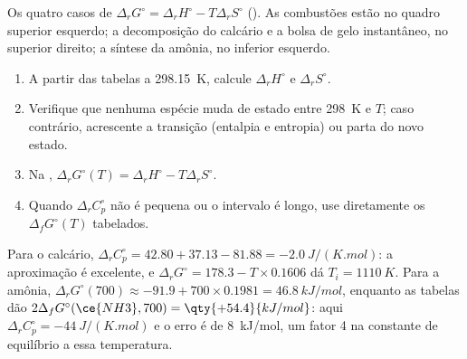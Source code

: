 \begin{omfigure}

{\small Os quatro casos de $\Delta_r G^\circ = \Delta_r H^\circ - T\Delta_r
S^\circ$ (). As combustões estão no quadro superior
esquerdo; a decomposição do calcário e a bolsa de gelo instantâneo, no
superior direito; a síntese da amônia, no inferior esquerdo.}
\end{omfigure}

\begin{method}\label{met:b2:reaction-free-energy:delta-g-standard}
\begin{enumerate}
  \item A partir das tabelas a \qty{298.15}{K}, calcule $\Delta_r H^\circ$ e
        $\Delta_r S^\circ$.
  \item Verifique que nenhuma espécie muda de estado entre \qty{298}{K} e $T$;
        caso contrário, acrescente a transição (entalpia e entropia) ou parta
        do novo estado.
  \item Na , $\Delta_r G^\circ(T) = \Delta_r H^\circ
        - T\Delta_r S^\circ$.
  \item Quando $\Delta_r C^\circ_p$ não é pequena ou o intervalo é longo,
        use diretamente os $\Delta_f G^\circ(T)$ tabelados.
\end{enumerate}
\end{method}

\begin{example}\label{ex:b2:reaction-free-energy:tests}
Para o calcário, $\Delta_r C^\circ_p = 42.80 + 37.13 - 81.88 =
\qty{-2.0}{J/(K.mol)}$: a aproximação é excelente, e $\Delta_r
G^\circ = 178.3 - T \times 0.1606$ dá $T_i = \qty{1110}{K}$. Para a amônia,
$\Delta_r G^\circ(700) \approx -91.9 + 700 \times 0.1981 =
\qty{+46.8}{kJ/mol}$, enquanto as tabelas dão $2\Delta_f G^\circ(\ce{NH3}, 700) =
\qty{+54.4}{kJ/mol}$: aqui $\Delta_r C^\circ_p = \qty{-44}{J/(K.mol)}$ e
o erro é de \qty{8}{kJ/mol}, um fator 4 na constante de equilíbrio a
essa temperatura.
\end{example}

